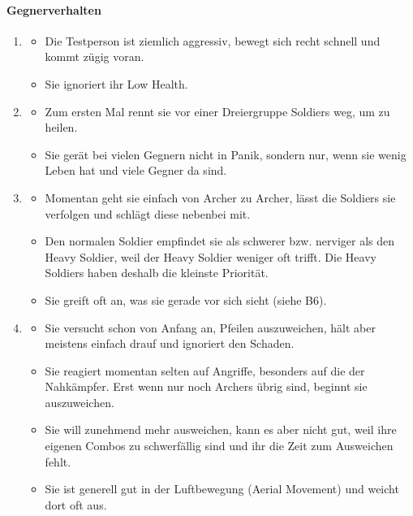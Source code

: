 \documentclass[../Main.tex]{subfiles}
\begin{document}
\paragraph{Gegnerverhalten}
\begin{enumerate}[label=\textbf{B\arabic*}, leftmargin=1.5cm, itemsep=0.8em]
\item
\begin{itemize}[nosep]
    \item Die Testperson ist ziemlich aggressiv, bewegt sich recht schnell und kommt zügig voran.
    \item Sie ignoriert ihr Low Health.
\end{itemize}

\item
\begin{itemize}[nosep]
    \item Zum ersten Mal rennt sie vor einer Dreiergruppe Soldiers weg, um zu heilen.
    \item Sie gerät bei vielen Gegnern nicht in Panik, sondern nur, wenn sie wenig Leben hat und viele Gegner da sind.
\end{itemize}

\item
\begin{itemize}[nosep]
    \item Momentan geht sie einfach von Archer zu Archer, lässt die Soldiers sie verfolgen und schlägt diese nebenbei mit.
    \item Den normalen Soldier empfindet sie als schwerer bzw. nerviger als den Heavy Soldier, weil der Heavy Soldier weniger oft trifft. Die Heavy Soldiers haben deshalb die kleinste Priorität.
    \item Sie greift oft an, was sie gerade vor sich sieht (siehe B6).
\end{itemize}

\item
\begin{itemize}[nosep]
    \item Sie versucht schon von Anfang an, Pfeilen auszuweichen, hält aber meistens einfach drauf und ignoriert den Schaden.
    \item Sie reagiert momentan selten auf Angriffe, besonders auf die der Nahkämpfer. Erst wenn nur noch Archers übrig sind, beginnt sie auszuweichen.
    \item Sie will zunehmend mehr ausweichen, kann es aber nicht gut, weil ihre eigenen Combos zu schwerfällig sind und ihr die Zeit zum Ausweichen fehlt.
    \item Sie ist generell gut in der Luftbewegung (Aerial Movement) und weicht dort oft aus.
\end{itemize}


\end{enumerate}
\end{document}
